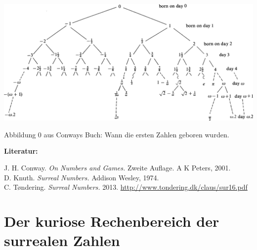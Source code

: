 \documentclass{../zirkelblatt}
\newcommand{\head}[1]{\section*{\rmfamily #1}}%
\begin{document}
\begin{landscape}
\thispagestyle{empty}
\begin{center}
\includegraphics[scale=0.6]{stammbaum-der-surrealen-zahlen}

Abbildung 0 aus Conways Buch: Wann die ersten Zahlen geboren wurden.
\end{center}

\vfill
\textbf{Literatur:}

J. H. Conway. \emph{On Numbers and Games.} Zweite Auflage. A K Peters, 2001. \\
D. Knuth. \emph{Surreal Numbers.} Addison Wesley, 1974. \\
C. Tøndering. \emph{Surreal Numbers.} 2013.
\url{http://www.tondering.dk/claus/sur16.pdf}
\end{landscape}

\addtocounter{aufgabennummer}{-1}

\head{Der kuriose Rechenbereich der surrealen Zahlen}
\end{document}

